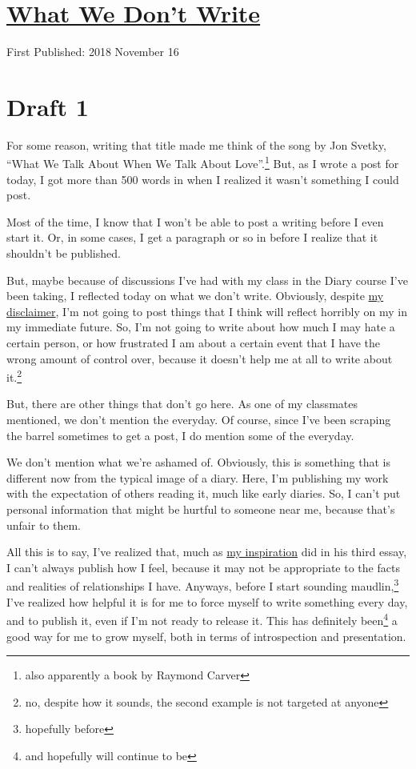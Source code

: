 \documentclass[12pt]{article}[titlepage]
\newcommand{\say}[1]{``#1''}
\newcommand{\1}{\={a}}
\newcommand{\2}{\={e}}
\newcommand{\3}{\={\i}}
\newcommand{\4}{\=o}
\newcommand{\5}{\=u}
\newcommand{\6}{\={A}}
\renewcommand{\,}{\textsuperscript{,}}
\begin{document}
\doublespacing
\section{\href{what-we-dont-write.html}{What We Don't Write}}
First Published: 2018 November 16
\section{Draft 1}
For some reason, writing that title made me think of the song by Jon Svetky, \say{What We Talk About When We Talk About Love}.\footnote{also apparently a book by Raymond Carver}
But, as I wrote a post for today, I got more than 500 words in when I realized it wasn't something I could post.

Most of the time, I know that I won't be able to post a writing before I even start it.
Or, in some cases, I get a paragraph or so in before I realize that it shouldn't be published.

But, maybe because of discussions I've had with my class in the Diary course I've been taking, I reflected today on what we don't write.
Obviously, despite \href{disclaimer.html}{my disclaimer}, I'm not going to post things that I think will reflect horribly on my in my immediate future.
So, I'm not going to write about how much I may hate a certain person, or how frustrated I am about a certain event that I have the wrong amount of control over, because it doesn't help me at all to write about it.\footnote{no, despite how it sounds, the second example is not targeted at anyone}

But, there are other things that don't go here.
As one of my classmates mentioned, we don't mention the everyday.
Of course, since I've been scraping the barrel sometimes to get a post, I do mention some of the everyday.

We don't mention what we're ashamed of.
Obviously, this is something that is different now from the typical image of a diary.
Here, I'm publishing my work with the expectation of others reading it, much like early diaries.
So, I can't put personal information that might be hurtful to someone near me, because that's unfair to them.

All this is to say, I've realized that, much as \href{http://www.cs.grinnell.edu/~rebelsky/musings/}{my inspiration} did in his third essay, I can't always publish how I feel, because it may not be appropriate to the facts and realities of relationships I have.
Anyways, before I start sounding maudlin,\footnote{hopefully before} I've realized how helpful it is for me to force myself to write something every day, and to publish it, even if I'm not ready to release it.
This has definitely been\footnote{and hopefully will continue to be} a good way for me to grow myself, both in terms of introspection and presentation.
\end{document}
